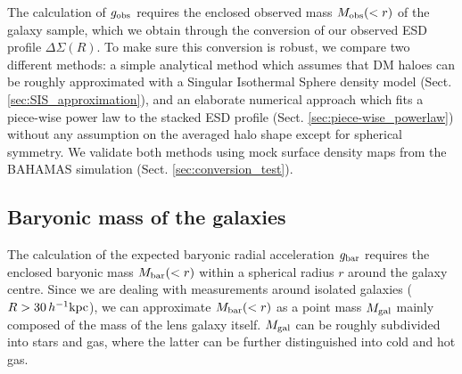 \documentclass[usenatbib]{mnras}
\newcommand{\hkpc}{\, h^{-1}{\rm{kpc}} }
\newcommand{\un}[1]{_{\rm #1}}
\begin{document}
The calculation of $g\un{obs}$ requires the enclosed observed mass $M\un{obs}(<r)$ of the galaxy sample, which we obtain through the conversion of our observed ESD profile \mbox{$\Delta\Sigma(R)$}. To make sure this conversion is robust, we compare two different methods: a simple analytical method which assumes that DM haloes can be roughly approximated with a Singular Isothermal Sphere density model (Sect. \ref{sec:SIS_approximation}), and an elaborate numerical approach which fits a piece-wise power law to the stacked ESD profile (Sect. \ref{sec:piece-wise_powerlaw}) without any assumption on the averaged halo shape except for spherical symmetry. We validate both methods using mock surface density maps from the BAHAMAS simulation (Sect. \ref{sec:conversion_test}).

\subsection{Baryonic mass of the galaxies}
\label{sec:baryonic_mass}


The calculation of the expected baryonic radial acceleration $g\un{bar}$ requires the enclosed baryonic mass $M\un{bar}(<r)$ within a spherical radius $r$ around the galaxy centre. Since we are dealing with measurements around isolated galaxies ($R > 30 \hkpc$), we can approximate $M\un{bar}(<r)$ as a point mass $M\un{gal}$ mainly composed of the mass of the lens galaxy itself. $M\un{gal}$ can be roughly subdivided into stars and gas, where the latter can be further distinguished into cold and hot gas.
\end{document}
